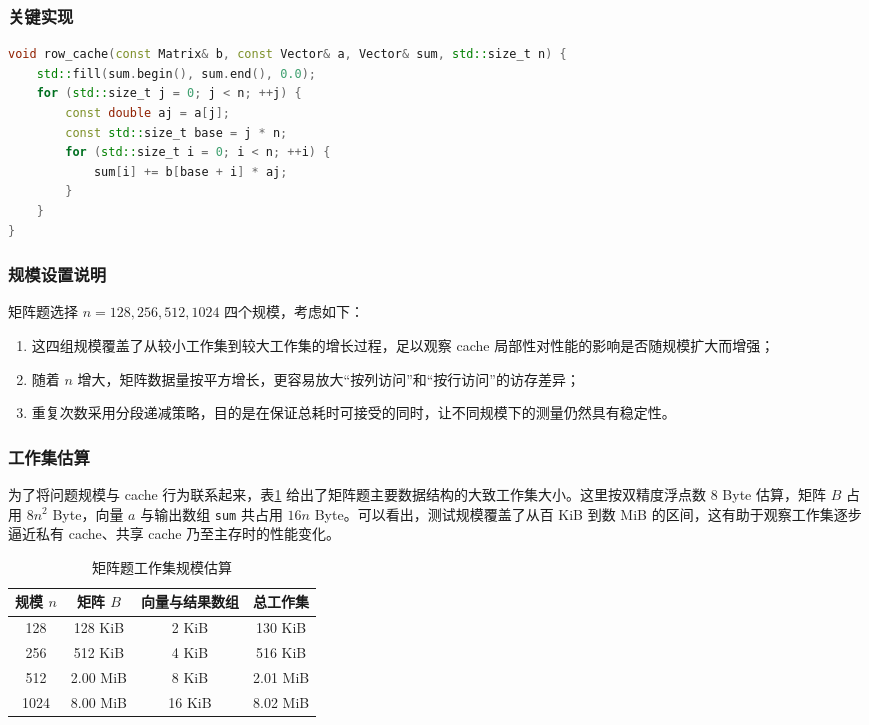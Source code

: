 \documentclass[a4paper]{article}
\begin{document}
\subsubsection{关键实现}
\begin{lstlisting}[title=矩阵题中按行访问的核心实现,frame=trbl,language={C++}]
void row_cache(const Matrix& b, const Vector& a, Vector& sum, std::size_t n) {
    std::fill(sum.begin(), sum.end(), 0.0);
    for (std::size_t j = 0; j < n; ++j) {
        const double aj = a[j];
        const std::size_t base = j * n;
        for (std::size_t i = 0; i < n; ++i) {
            sum[i] += b[base + i] * aj;
        }
    }
}
\end{lstlisting}

\subsubsection{规模设置说明}
矩阵题选择 $n=128,256,512,1024$ 四个规模，考虑如下：
\begin{enumerate}
  \item 这四组规模覆盖了从较小工作集到较大工作集的增长过程，足以观察 cache 局部性对性能的影响是否随规模扩大而增强；
  \item 随着 $n$ 增大，矩阵数据量按平方增长，更容易放大“按列访问”和“按行访问”的访存差异；
  \item 重复次数采用分段递减策略，目的是在保证总耗时可接受的同时，让不同规模下的测量仍然具有稳定性。
\end{enumerate}

\subsubsection{工作集估算}
为了将问题规模与 cache 行为联系起来，表\ref{tab:matrix-footprint} 给出了矩阵题主要数据结构的大致工作集大小。这里按双精度浮点数 8 Byte 估算，矩阵 $B$ 占用 $8n^2$ Byte，向量 $a$ 与输出数组 \texttt{sum} 共占用 $16n$ Byte。可以看出，测试规模覆盖了从百 KiB 到数 MiB 的区间，这有助于观察工作集逐步逼近私有 cache、共享 cache 乃至主存时的性能变化。

\begin{table}[H]
  \centering
  \begin{tabular}{cccc}
  \toprule
  规模 $n$ & 矩阵 $B$ & 向量与结果数组 & 总工作集 \\
  \midrule
  128 & 128 KiB & 2 KiB & 130 KiB \\
  256 & 512 KiB & 4 KiB & 516 KiB \\
  512 & 2.00 MiB & 8 KiB & 2.01 MiB \\
  1024 & 8.00 MiB & 16 KiB & 8.02 MiB \\
  \bottomrule
  \end{tabular}
  \caption{矩阵题工作集规模估算}
  \label{tab:matrix-footprint}
\end{table}
\end{document}
